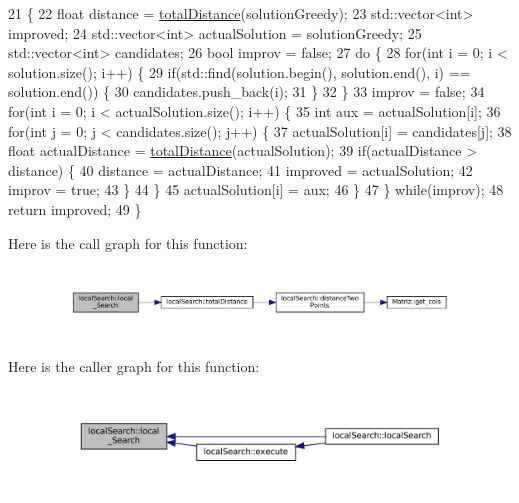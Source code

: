 \begin{DoxyCode}
21 \{
22   \textcolor{keywordtype}{float} distance = \hyperlink{classlocalSearch_a0b14e5f24760de3ea567ff507d3a2ece}{totalDistance}(solutionGreedy);
23   std::vector<int> improved;
24   std::vector<int> actualSolution = solutionGreedy;
25   std::vector<int> candidates;
26   \textcolor{keywordtype}{bool} improv = \textcolor{keyword}{false};
27   \textcolor{keywordflow}{do} \{
28     \textcolor{keywordflow}{for}(\textcolor{keywordtype}{int} i = 0; i < solution.size(); i++) \{
29       \textcolor{keywordflow}{if}(std::find(solution.begin(), solution.end(), i) == solution.end()) \{
30         candidates.push\_back(i);
31       \}
32     \}
33     improv = \textcolor{keyword}{false};
34     \textcolor{keywordflow}{for}(\textcolor{keywordtype}{int} i = 0; i < actualSolution.size(); i++) \{
35       \textcolor{keywordtype}{int} aux = actualSolution[i];
36       \textcolor{keywordflow}{for}(\textcolor{keywordtype}{int} j = 0; j < candidates.size(); j++) \{
37         actualSolution[i] = candidates[j];
38         \textcolor{keywordtype}{float} actualDistance = \hyperlink{classlocalSearch_a0b14e5f24760de3ea567ff507d3a2ece}{totalDistance}(actualSolution);
39         \textcolor{keywordflow}{if}(actualDistance > distance) \{
40           distance = actualDistance;
41           improved = actualSolution;
42           improv = \textcolor{keyword}{true};
43         \}
44       \}
45       actualSolution[i] = aux;
46     \}
47   \} \textcolor{keywordflow}{while}(improv);
48   \textcolor{keywordflow}{return} improved;
49 \}
\end{DoxyCode}
Here is the call graph for this function\+:
\nopagebreak
\begin{figure}[H]
\begin{center}
\leavevmode
\includegraphics[width=350pt]{classlocalSearch_afe2b71349ac06285bdccaf85847650c0_cgraph}
\end{center}
\end{figure}
Here is the caller graph for this function\+:
\nopagebreak
\begin{figure}[H]
\begin{center}
\leavevmode
\includegraphics[width=350pt]{classlocalSearch_afe2b71349ac06285bdccaf85847650c0_icgraph}
\end{center}
\end{figure}
\mbox{\label{classlocalSearch_a0b14e5f24760de3ea567ff507d3a2ece}} 
